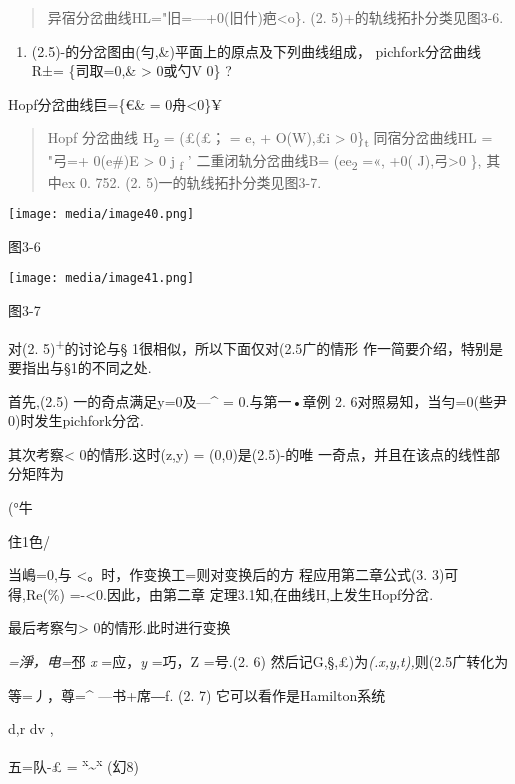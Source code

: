 \documentclass{article}
\begin{document}
\begin{quote}
异宿分岔曲线HL="旧=---+0(旧什)疤\textless{}o\}. (2.
5)+的轨线拓扑分类见图3-6.
\end{quote}

\begin{enumerate}
\def\labelenumi{(\arabic{enumi})}
\setcounter{enumi}{2}
\item
  (2.5)-的分岔图由(勻,\&)平面上的原点及下列曲线组成，
  pichfork分岔曲线R±= \{司取=0,\& \textgreater{} 0或勺V 0\} ?
\end{enumerate}

Hopf分岔曲线巨=\{€\& = 0舟\textless{}0\}¥

\begin{quote}
Hopf 分岔曲线 H\textsubscript{2} = (£(£； = e, + O(W),£i \textgreater{}
0\}\textsubscript{t} 同宿分岔曲线HL = "\textbar{}弓=+ 0(e\#)E
\textgreater{} 0 j \textsubscript{f} ' 二重闭轨分岔曲线B=
(e\textbar{}e\textsubscript{2} =«, +0( J),弓\textgreater{}0 \}, 其中ex
0. 752. (2. 5)一的轨线拓扑分类见图3-7.
\end{quote}

\texttt{[image: media/image40.png]}

图3-6

\texttt{[image: media/image41.png]}

图3-7

对(2. 5)\textsuperscript{+}的讨论与§ 1很相似，所以下面仅对(2.5广的情形
作一简要介绍，特别是要指出与§1的不同之处.

首先,(2.5) 一的奇点满足y=0及---\^{} = 0.与第一•章例 2.
6对照易知，当勻=0(些尹0)时发生pichfork分岔.

其次考察\textless{} 0的情形.这时(z,y) = (0,0)是(2.5)-的唯
一奇点，并且在该点的线性部分矩阵为

(°牛

住1色/

当嶋=0,与 \textless{}。时，作变换工=则对变换后的方 程应用第二章公式(3.
3)可得,Re(\%) =-\textbar{}\textless{}0.因此，由第二章
定理3.1知,在曲线H,上发生Hopf分岔.

最后考察勻\textgreater{} 0的情形.此时进行变换

\emph{=淨，电=}邳 \emph{x} =应，\emph{y} =巧，Z =号.(2. 6)
然后记G,§,£)为\emph{(.x,y,t),}则(2.5广转化为

等=丿，尊=\^{} ---书+席―f. (2. 7) 它可以看作是Hamilton系统

{d,r} dv ,

五=队-£ = \textsuperscript{x}\textasciitilde{}\textsuperscript{x} (幻8)
\end{document}
